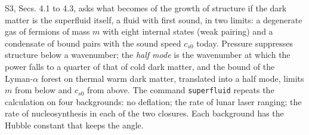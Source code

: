 \documentclass[
  10pt,
]{article}
\begin{document}
S3, Secs. 4.1 to 4.3, asks what becomes of the growth of structure if
the dark matter is the superfluid itself, a fluid with first sound, in
two limits: a degenerate gas of fermions of mass \(m\) with eight
internal states (weak pairing) and a condensate of bound pairs with the
sound speed \(c_{s0}\) today. Pressure suppresses structure below a
wavenumber; the \emph{half mode} is the wavenumber at which the power
falls to a quarter of that of cold dark matter, and the bound of the
Lyman-\(\alpha\) forest on thermal warm dark matter, translated into a
half mode, limits \(m\) from below and \(c_{s0}\) from above. The
command \texttt{superfluid} repeats the calculation on four backgrounds:
no deflation; the rate of lunar laser ranging; the rate of
nucleosynthesis in each of the two closures. Each background has the
Hubble constant that keeps the angle.
\end{document}
